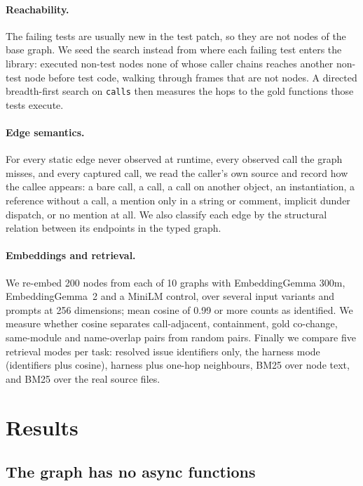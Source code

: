 \documentclass[10pt,a4paper]{article}
\newcommand{\code}[1]{\path{#1}}
\begin{document}
\paragraph{Reachability.} The failing tests are usually new in the test patch, so they are not nodes of the base graph. We seed the search instead from where each failing test enters the library: executed non-test nodes none of whose caller chains reaches another non-test node before test code, walking through frames that are not nodes. A directed breadth-first search on \texttt{calls} then measures the hops to the gold functions those tests execute.

\paragraph{Edge semantics.} For every static edge never observed at runtime, every observed call the graph misses, and every captured call, we read the caller's own source and record how the callee appears: a bare call, a \code{self.} call, a call on another object, an instantiation, a reference without a call, a mention only in a string or comment, implicit dunder dispatch, or no mention at all. We also classify each edge by the structural relation between its endpoints in the typed graph.

\paragraph{Embeddings and retrieval.} We re-embed 200 nodes from each of 10 graphs with EmbeddingGemma 300m, EmbeddingGemma~2 and a MiniLM control, over several input variants and prompts at 256 dimensions; mean cosine of 0.99 or more counts as identified. We measure whether cosine separates call-adjacent, containment, gold co-change, same-module and name-overlap pairs from random pairs. Finally we compare five retrieval modes per task: resolved issue identifiers only, the harness mode (identifiers plus cosine), harness plus one-hop neighbours, BM25 over node text, and BM25 over the real source files.

\section{Results}

\subsection{The graph has no async functions}\label{sec:omission}
\end{document}
